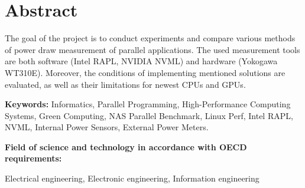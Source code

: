 \chapter*{Abstract}


The goal of the project is to conduct experiments and compare various methods
of power draw measurement of parallel applications. The used measurement
tools are both software (Intel RAPL, NVIDIA NVML) and hardware
(Yokogawa WT310E). Moreover, the conditions of implementing mentioned
solutions are evaluated, as well as their limitations for newest CPUs and GPUs.

\bigskip
\noindent
\textbf{Keywords:} Informatics, Parallel Programming,
High-Performance Computing Systems, Green Computing, NAS Parallel Benchmark,
Linux Perf, Intel RAPL, NVML, Internal Power Sensors, External Power Meters.

\bigskip
\noindent
\textbf{Field of science and technology in accordance with OECD
requirements:}

\noindent
Electrical engineering, Electronic engineering, Information engineering

